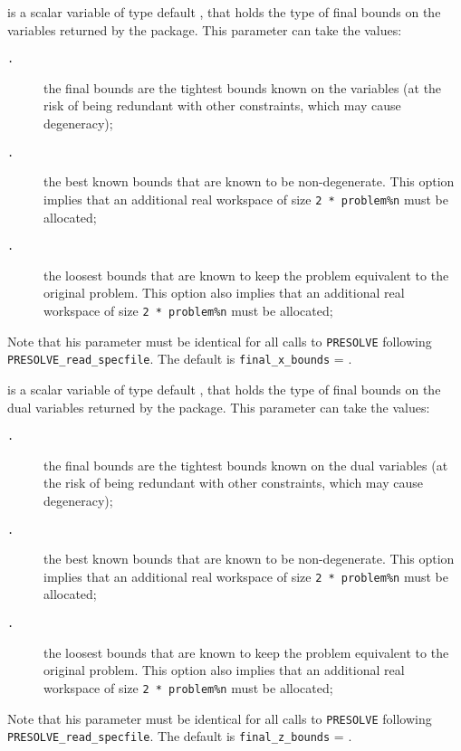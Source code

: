 \documentclass{galahad}
\newcommand{\packagename}{PRESOLVE}
\newcommand{\sym}{\tt\small}
\begin{document}
\begin{description}
 is a scalar variable of type default \integer, that
holds the type of final bounds on the variables returned by the
package.  This parameter can take the values:
\begin{description}
\item[\sym \galsymtightest.] the final bounds are the tightest bounds
                known on the variables (at the risk of
                being redundant with other constraints,
                which may cause degeneracy);
\item[\sym \galsymnondegenerate.] the best known bounds that are known to
                      be non-degenerate. This option implies
                      that an additional real workspace of size
                      {\tt 2 * problem\%n} must be allocated;
\item[\sym \galsymloosest.] the loosest bounds that are known to
               keep the problem equivalent to the
               original problem. This option also
               implies that an additional real workspace of size
               {\tt 2 * problem\%n} must be allocated;
\end{description}
Note that his parameter must be identical for all calls to
{\tt \packagename} following {\tt \packagename\_read\_specfile}.
The default is {\tt final\_x\_bounds} = {\sym \galsymtightest}.

 is a scalar variable of type default \integer, that
holds the type of final bounds on the dual variables returned by
the package.  This parameter can take the values:
\begin{description}
\item[\sym \galsymtightest.] the final bounds are the tightest bounds
                known on the dual variables (at the risk of
                being redundant with other constraints,
                which may cause degeneracy);
\item[\sym \galsymnondegenerate.] the best known bounds that are known to
                      be non-degenerate. This option implies
                      that an additional real workspace of size
                      {\tt 2 * problem\%n} must be allocated;
\item[\sym \galsymloosest.] the loosest bounds that are known to
               keep the problem equivalent to the
               original problem. This option also
               implies that an additional real workspace of size
               {\tt 2 * problem\%n} must be allocated;
\end{description}
Note that his parameter must be identical for all calls to
{\tt \packagename} following {\tt \packagename\_read\_specfile}.
The default is {\tt final\_z\_bounds} = {\sym \galsymtightest}.


\end{description}
\end{document}
